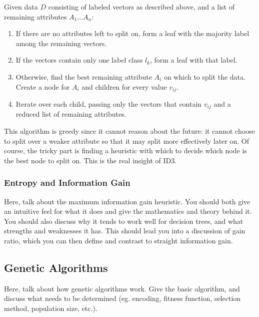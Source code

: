 \documentclass[12pt, letterpaper]{article}
\begin{document}
Given data $D$ consisting of labeled vectors as described above, and a list of remaining attributes $A_1\dots A_n$:

\begin{enumerate}
    \item If there are no attributes left to split on, form a leaf with the majority label among the remaining vectors.
    \item If the vectors contain only one label class $l_k$, form a leaf with that label.
    \item Otherwise, find the best remaining attribute $A_i$ on which to split the data. Create a node for $A_i$ and children for every value $v_{ij}$.
    \item Iterate over each child, passing only the vectors that contain $v_{ij}$ and a reduced list of remaining attributes.
\end{enumerate}

This algorithm is greedy since it cannot reason about the future: it cannot choose to split over a weaker attribute so that it may split more effectively later on.
Of course, the tricky part is finding a heuristic with which to decide which node is the best node to split on. This is the real insight of ID3.

\subsubsection*{Entropy and Information Gain}



Here, talk about the maximum information gain heuristic.  You should both give
an intuitive feel for what it does and give the mathematics and theory behind
it.  You should also discuss why it tends to work well for decision trees, and
what strengths and weaknesses it has.  This should lead you into a discussion of
gain ratio, which you can then define and contrast to straight information gain.

\subsection{Genetic Algorithms}
Here, talk about how genetic algorithms work.  Give the basic algorithm, and
discuss what needs to be determined (eg. encoding, fitness function, selection
method, population size, etc.).
\end{document}
